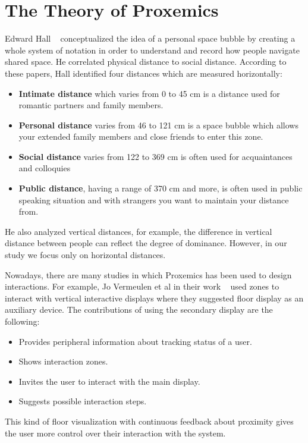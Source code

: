 \section{The Theory of Proxemics}
\label{sec:The Theory of Proxemics}
Edward Hall ~\cite{hall1963system,hall1910hidden} conceptualized the idea of a
personal space bubble by creating a whole system of notation in order to understand
and record how people navigate shared space.
He correlated physical distance to social distance.
According to these papers, Hall identified four distances which are measured horizontally:
\begin{itemize}
  \item \textbf{Intimate distance} which varies from 0 to 45 cm is a distance used for romantic partners and family members.
  \item \textbf{Personal distance} varies from 46 to 121 cm is a space bubble which allows your extended family
        members and close friends to enter this zone.
  \item \textbf{Social distance} varies from 122 to 369 cm is often used for acquaintances and colloquies
  \item \textbf{Public distance}, having a range of 370 cm and more, is often used in public speaking
        situation and with strangers you want to maintain your distance from.
\end{itemize}

He also analyzed vertical distances, for example, the difference in vertical distance
between people can reflect the degree of dominance.
However, in our study we focus only on horizontal distances.

Nowadays, there are many studies in which Proxemics has been used to design interactions.
For example, Jo Vermeulen et al in their work ~\cite{vermeulen2015proxemic} used zones to
interact with vertical interactive displays where they suggested floor display as an auxiliary device.
The contributions of using the secondary display are the following:
\begin{itemize}
    \item Provides peripheral information about tracking status of a user.
    \item Shows interaction zones.
    \item Invites the user to interact with the main display.
    \item Suggests possible interaction steps.
\end{itemize}
This kind of floor visualization with continuous feedback about proximity gives the user
more control over their interaction with the system.

